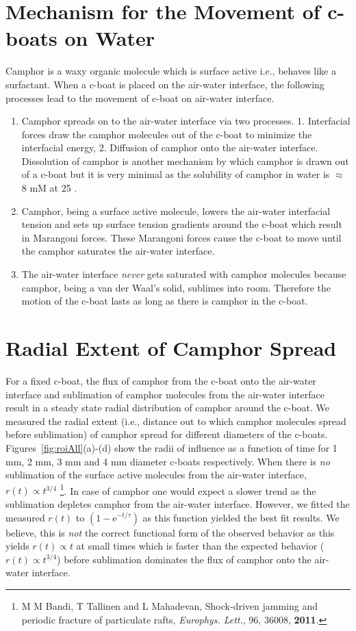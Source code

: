 \documentclass[12pt]{article}
\begin{document}
\section{Mechanism for the Movement of c-boats on Water}
Camphor is a waxy organic molecule which is surface active i.e., behaves like a surfactant. When a c-boat is placed on the air-water interface, the following processes lead to the movement of c-boat on air-water interface. 
\begin{enumerate}
\item Camphor spreads on to the air-water interface via two processes. 1. Interfacial forces draw the camphor molecules out of the c-boat to minimize the interfacial energy, 2. Diffusion of camphor onto the air-water interface. Dissolution of camphor is another mechanism by which camphor is drawn out of a c-boat but it is very minimal as the solubility of camphor in water is $\approx$ 8 mM at 25 \celsius.  
\item Camphor, being a surface active molecule, lowers the air-water interfacial tension and sets up surface tension gradients around the c-boat which result in Marangoni forces. These Marangoni forces cause the c-boat to move until the camphor saturates the air-water interface.  
\item The air-water interface \emph{never} gets saturated with camphor molecules because camphor, being a van der Waal's solid, sublimes into room. Therefore the motion of the c-boat lasts as long as there is camphor in the c-boat. 
\end{enumerate} 

\section{Radial Extent of Camphor Spread}
For a fixed c-boat, the flux of camphor from the c-boat onto the air-water interface and sublimation of camphor molecules from the air-water interface result in a steady state radial distribution of camphor around the c-boat. We measured the radial extent (i.e., distance out to which camphor molecules spread before sublimation) of camphor spread for different diameters of the c-boats. Figures~\ref{fig:roiAll}(a)-(d) show the radii of influence as a function of time for 1 mm, 2 mm, 3 mm and 4 mm diameter c-boats respectively. 
When there is \emph{no} sublimation of the surface active molecules from the air-water interface, $r(t) \propto t^{3/4}$ \footnote{\label{ref:mmb}M M Bandi, T Tallinen and L Mahadevan, Shock-driven jamming and periodic fracture of particulate rafts, \emph{Europhys. Lett.}, 96, 36008, {\bf 2011}.}. In case of camphor one would expect a slower trend as the sublimation depletes camphor from the air-water interface. However, we fitted the measured $r(t)$ to $(1-\mathrm{e}^{-t/\tau})$ as this function yielded the best fit results. We believe, this is \emph{not} the correct functional form of the observed behavior as this yields $r(t) \propto t$ at small times which is faster than the expected behavior ($r(t) \propto t^{3/4}$) before sublimation dominates the flux of camphor onto the air-water interface. 
\end{document}
